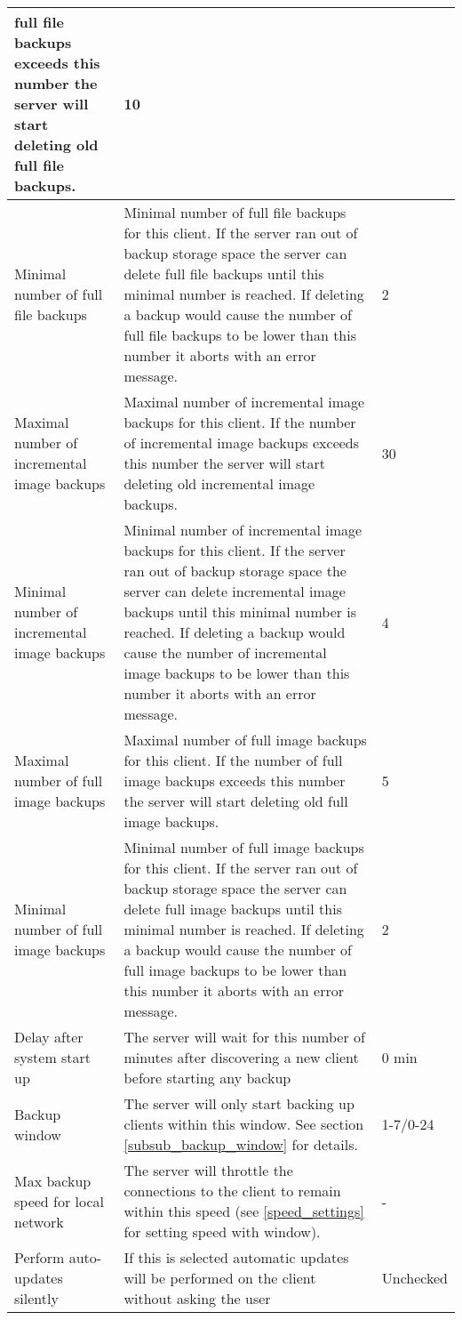 \documentclass[a4paper,10pt]{article}
\begin{document}
\begin{longtable}{|p{}|p{}|p{}|}
 full file backups exceeds this number the server will start deleting old full file backups. & 10\\
\hline
Minimal number of full file backups & Minimal number of full file backups for this client. If the server ran out of backup storage space the server can delete full file backups until this minimal number is reached. If deleting a backup would cause the number of full file backups to be lower than this number it aborts with an error message. & 2\\
\hline
Maximal number of incremental image backups & Maximal number of incremental image backups for this client. If the number of incremental image backups exceeds this number the server will start deleting old incremental image backups. & 30\\
\hline
Minimal number of incremental image backups & Minimal number of incremental image backups for this client. If the server ran out of backup storage space the server can delete incremental image backups until this minimal number is reached. If deleting a backup would cause the number of incremental image backups to be lower than this number it aborts with an error message. & 4\\
\hline
Maximal number of full image backups & Maximal number of full image backups for this client. If the number of
 full image backups exceeds this number the server will start deleting old full image backups. & 5\\
\hline
Minimal number of full image backups & Minimal number of full image backups for this client. If the server ran out of backup storage space the server can delete full image backups until this minimal number is reached. If deleting a backup would cause the number of full image backups to be lower than this number it aborts with an error message. & 2\\
\hline
Delay after system start up & The server will wait for this number of minutes after discovering a new client before starting any backup & 0 min\\
\hline
Backup window & The server will only start backing up clients within this window. See section \ref{subsub_backup_window} for details. & 1-7/0-24\\
\hline
Max backup speed for local network & The server will throttle the connections to the client to remain within this speed (see \ref{speed_settings} for setting speed with window). & -\\
\hline
Perform auto-updates silently & If this is selected automatic updates will be performed on the client without asking the user & Unchecked\\

\end{longtable}
\end{document}
